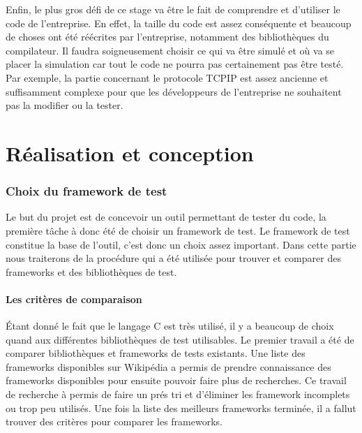 \documentclass[a4paper]{article}
\begin{document}
Enfin, le plus gros défi de ce stage va être le fait de comprendre et d'utiliser
le code de l'entreprise. En effet, la taille du code est assez conséquente et
beaucoup de choses ont été réécrites par l'entreprise, notamment des
bibliothèques du compilateur. Il faudra soigneusement choisir ce qui va être
simulé et où va se placer la simulation car tout le code ne pourra pas
certainement pas être testé. Par exemple, la partie concernant le protocole
TCPIP est assez ancienne et suffisamment complexe pour que les développeurs de
l'entreprise ne souhaitent pas la modifier ou la tester.
\clearpage
\part{Réalisation et conception}

\section{Choix du framework de test}%

Le but du projet est de concevoir un outil permettant de tester du code, la
première tâche à donc été de choisir un framework de test. Le framework de test
constitue la base de l'outil, c'est donc un choix assez important. Dans cette
partie nous traiterons de la procédure qui a été utilisée pour trouver et
comparer des frameworks et des bibliothèques de test.

\subsection{Les critères de comparaison}%

Étant donné le fait que le langage C est très utilisé, il y a beaucoup de choix
quand aux différentes bibliothèques de test utilisables. Le premier travail a
été de comparer bibliothèques et frameworks de tests existants. Une liste des
frameworks disponibles sur Wikipédia \cite{enwikiframeworks} a permis de prendre
connaissance des frameworks disponibles pour ensuite pouvoir faire plus de
recherches. Ce travail de recherche à permis de faire un prés tri et d'éliminer
les framework incomplets ou trop peu utilisés. Une fois la liste des meilleurs
frameworks terminée, il a fallut trouver des critères pour comparer les
frameworks. \\
\end{document}
